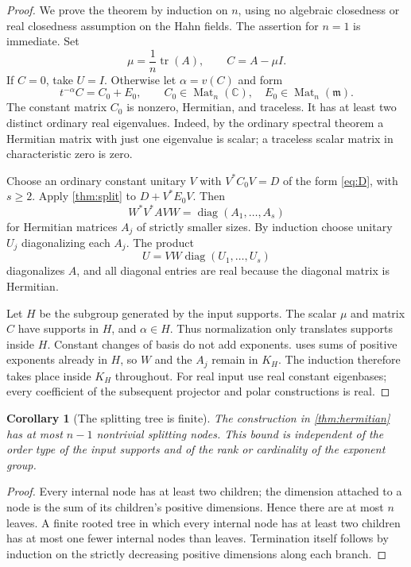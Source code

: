 \documentclass[11pt,letterpaper]{article}
\numberwithin{equation}{section}
\newtheorem{corollary}[theorem]{Corollary}
\theoremstyle{definition}
\theoremstyle{remark}
\newcommand{\C}{\mathbb C}
\newcommand{\mm}{\mathfrak m}
\newcommand{\Mat}{\operatorname{Mat}}
\newcommand{\diag}{\operatorname{diag}}
\newcommand{\tr}{\operatorname{tr}}
\begin{document}
\begin{proof}
We prove the theorem by induction on $n$, using no algebraic closedness or
real closedness assumption on the Hahn fields. The assertion for $n=1$ is
immediate. Set
\begin{equation}\label{eq:trace-subtract}
 \mu=\frac1n\tr(A),\qquad C=A-\mu I.
\end{equation}
If $C=0$, take $U=I$. Otherwise let $\alpha=v(C)$ and form
\begin{equation}\label{eq:normalize}
 t^{-\alpha}C=C_0+E_0,
 \qquad C_0\in\Mat_n(\C),\quad E_0\in\Mat_n(\mm).
\end{equation}
The constant matrix $C_0$ is nonzero, Hermitian, and traceless. It has at least
two distinct ordinary real eigenvalues. Indeed, by the ordinary spectral
theorem a Hermitian matrix with just one eigenvalue is scalar; a traceless
scalar matrix in characteristic zero is zero.

Choose an ordinary constant unitary $V$ with $V^*C_0V=D$ of the form
\cref{eq:D}, with $s\ge2$. Apply \cref{thm:split} to
$D+V^*E_0V$. Then
\[
 W^*V^*AVW=\diag(A_1,\ldots,A_s)
\]
for Hermitian matrices $A_j$ of strictly smaller sizes. By induction choose
unitary $U_j$ diagonalizing each $A_j$. The product
\[
 U=VW\diag(U_1,\ldots,U_s)
\]
diagonalizes $A$, and all diagonal entries are real because the diagonal
matrix is Hermitian.

Let $H$ be the subgroup generated by the input supports. The scalar $\mu$
and matrix $C$ have supports in $H$, and $\alpha\in H$. Thus normalization
only translates supports inside $H$. Constant changes of basis do not add
exponents.  uses sums of positive exponents already in $H$,
so $W$ and the $A_j$ remain in $K_H$. The induction therefore takes place
inside $K_H$ throughout. For real input use real constant eigenbases; every
coefficient of the subsequent projector and polar constructions is real.
\end{proof}

\begin{corollary}[The splitting tree is finite]\label{cor:tree}
The construction in \cref{thm:hermitian} has at most $n-1$ nontrivial splitting
nodes. This bound is independent of the order type of the input supports and
of the rank or cardinality of the exponent group.
\end{corollary}
\begin{proof}
Every internal node has at least two children; the dimension attached to a
node is the sum of its children's positive dimensions. Hence there are at
most $n$ leaves. A finite rooted tree in which every internal node has at
least two children has at most one fewer internal nodes than leaves.
Termination itself follows by induction on the strictly decreasing positive
dimensions along each branch.
\end{proof}
\end{document}
